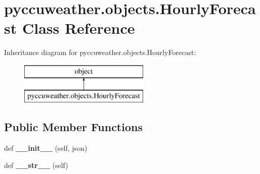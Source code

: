 \hypertarget{classpyccuweather_1_1objects_1_1_hourly_forecast}{}\section{pyccuweather.\+objects.\+Hourly\+Forecast Class Reference}
\label{classpyccuweather_1_1objects_1_1_hourly_forecast}
Inheritance diagram for pyccuweather.\+objects.\+Hourly\+Forecast\+:\begin{figure}[H]
\begin{center}
\leavevmode
\includegraphics[height=2.000000cm]{classpyccuweather_1_1objects_1_1_hourly_forecast}
\end{center}
\end{figure}
\subsection*{Public Member Functions}
\begin{DoxyCompactItemize}
\item 
\hypertarget{classpyccuweather_1_1objects_1_1_hourly_forecast_a42c16958d6739bef3dc896794af3845b}{}def {\bfseries \+\_\+\+\_\+init\+\_\+\+\_\+} (self, json)\label{classpyccuweather_1_1objects_1_1_hourly_forecast_a42c16958d6739bef3dc896794af3845b}

\item 
\hypertarget{classpyccuweather_1_1objects_1_1_hourly_forecast_ae814906e26d967ce0f90f020de774dd2}{}def {\bfseries \+\_\+\+\_\+str\+\_\+\+\_\+} (self)\label{classpyccuweather_1_1objects_1_1_hourly_forecast_ae814906e26d967ce0f90f020de774dd2}

\end{DoxyCompactItemize}
